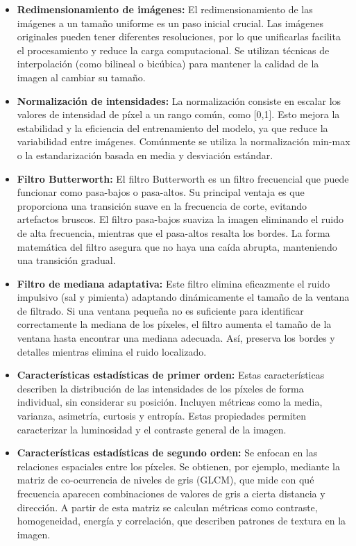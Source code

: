 \documentclass[12pt]{article}
\begin{document}
\begin{itemize}
  \item \textbf{Redimensionamiento de imágenes:} El redimensionamiento de las imágenes a un tamaño uniforme es un paso inicial crucial. Las imágenes originales pueden tener diferentes resoluciones, por lo que unificarlas facilita el procesamiento y reduce la carga computacional. Se utilizan técnicas de interpolación (como bilineal o bicúbica) para mantener la calidad de la imagen al cambiar su tamaño.

  \item \textbf{Normalización de intensidades:} La normalización consiste en escalar los valores de intensidad de píxel a un rango común, como [0,1]. Esto mejora la estabilidad y la eficiencia del entrenamiento del modelo, ya que reduce la variabilidad entre imágenes. Comúnmente se utiliza la normalización min-max o la estandarización basada en media y desviación estándar.

  \item \textbf{Filtro Butterworth:} El filtro Butterworth es un filtro frecuencial \cite{mathworks_butterworth} que puede funcionar como pasa-bajos o pasa-altos. Su principal ventaja es que proporciona una transición suave en la frecuencia de corte, evitando artefactos bruscos. El filtro pasa-bajos suaviza la imagen eliminando el ruido de alta frecuencia, mientras que el pasa-altos resalta los bordes. La forma matemática del filtro asegura que no haya una caída abrupta, manteniendo una transición gradual.

  \item \textbf{Filtro de mediana adaptativa:} Este filtro elimina eficazmente el ruido impulsivo (sal y pimienta) adaptando dinámicamente el tamaño de la ventana de filtrado. Si una ventana pequeña no es suficiente para identificar correctamente la mediana de los píxeles, el filtro aumenta el tamaño de la ventana hasta encontrar una mediana adecuada. Así, preserva los bordes y detalles mientras elimina el ruido localizado. \cite{scribd_median_filter}

  \item \textbf{Características estadísticas de primer orden:} Estas características describen la distribución de las intensidades de los píxeles de forma individual, sin considerar su posición. Incluyen métricas como la media, varianza, asimetría, curtosis y entropía.\cite{haralick1973} Estas propiedades permiten caracterizar la luminosidad y el contraste general de la imagen.

  \item \textbf{Características estadísticas de segundo orden:} Se enfocan en las relaciones espaciales entre los píxeles. Se obtienen, por ejemplo, mediante la matriz de co-ocurrencia de niveles de gris (GLCM),\cite{haralick1973} que mide con qué frecuencia aparecen combinaciones de valores de gris a cierta distancia y dirección. A partir de esta matriz se calculan métricas como contraste, homogeneidad, energía y correlación, que describen patrones de textura en la imagen.
\end{itemize}
\end{document}
